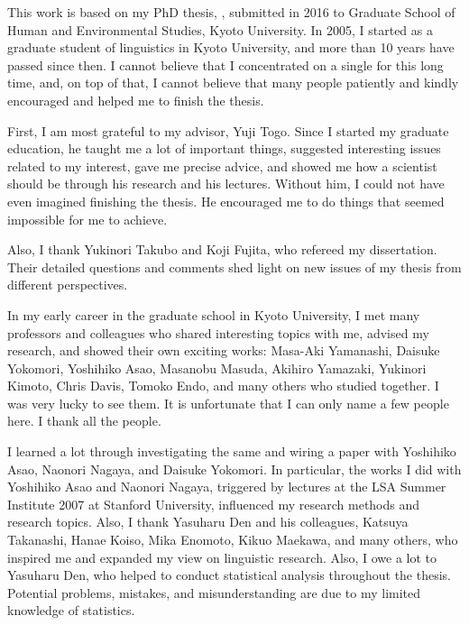 \begin{refsection}

This work is based on my PhD thesis,
,
submitted in 2016 to Graduate School of Human and Environmental Studies, Kyoto University.
In 2005, I started as a graduate student of linguistics in Kyoto University, and more than 10 years have passed since then.
I cannot believe that I concentrated on a single  for this long time,
and, on top of that,
I cannot believe that many people patiently and kindly
encouraged and helped me to finish the thesis.

First, I am most grateful to my advisor, Yuji Togo.
Since I started my graduate education,
he taught me a lot of important things,
suggested interesting issues related to my interest,
gave me precise advice, and
showed me how a scientist should be through his research and his lectures.
Without him,
I could not have even imagined finishing the thesis.
He encouraged me to do things that seemed impossible for me to achieve.

Also, I thank Yukinori Takubo and Koji Fujita,
who refereed my dissertation.
Their detailed questions and comments shed light on new issues of my thesis
from different perspectives.

In my early career in the graduate school in Kyoto University,
I met many professors and colleagues who shared interesting topics with me, advised my research, and showed their own exciting works:
Masa-Aki Yamanashi, Daisuke Yokomori, Yoshihiko Asao, Masanobu Masuda, Akihiro Yamazaki, Yukinori Kimoto, Chris Davis, Tomoko Endo, and many others who studied together.
I was very lucky to see them.
It is unfortunate that I can only name a few people here.
I thank all the people.

I learned a lot through investigating the same  and wiring a paper with Yoshihiko Asao, Naonori Nagaya, and Daisuke Yokomori.
In particular, the works I did with Yoshihiko Asao and Naonori Nagaya,
triggered by lectures at the LSA Summer Institute 2007 at Stanford University,
influenced my research methods and research topics.
Also, I thank Yasuharu Den and his colleagues, Katsuya Takanashi, Hanae Koiso, Mika Enomoto, Kikuo Maekawa, and many others,
who inspired me and expanded my view on linguistic research.
Also, I owe a lot to Yasuharu Den, who helped to conduct statistical analysis
throughout the thesis.
Potential problems, mistakes, and misunderstanding are due to my limited knowledge of statistics.


\end{refsection}
